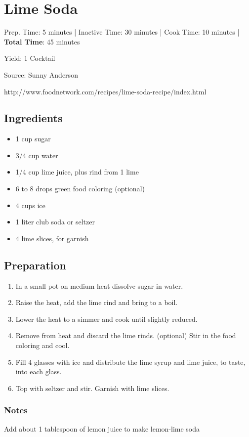 \section{Lime Soda}

\begin{center}
Prep. Time: 5 minutes |
Inactive Time: 30 minutes |
Cook Time: 10 minutes |
\textbf{Total Time}: 45 minutes

Yield: 1 Cocktail
\end{center}

Source: Sunny Anderson
\begin{center}
http://www.foodnetwork.com/recipes/lime-soda-recipe/index.html
\end{center}

\subsection{Ingredients}
\begin{multicols}{2}
\begin{itemize}
    \item 1 cup sugar
    \item 3/4 cup water
    \item 1/4 cup lime juice, plus rind from 1 lime
    \item 6 to 8 drops green food coloring (optional)
    \item 4 cups ice
    \item 1 liter club soda or seltzer
    \item 4 lime slices, for garnish
\end{itemize}
\end{multicols}

\subsection{Preparation}
\begin{enumerate}
    \item In a small pot on medium heat dissolve sugar in water.
    \item Raise the heat, add the lime rind and bring to a boil.
    \item Lower the heat to a simmer and cook until slightly reduced.
    \item Remove from heat and discard the lime rinds. (optional) Stir in the food coloring and cool.

    \vspace{3em}

    \item Fill 4 glasses with ice and distribute the lime syrup and lime juice, to taste, into each glass.
    \item Top with seltzer and stir. Garnish with lime slices.
\end{enumerate}

\subsubsection{Notes}

Add about 1 tablespoon of lemon juice to make lemon-lime soda

